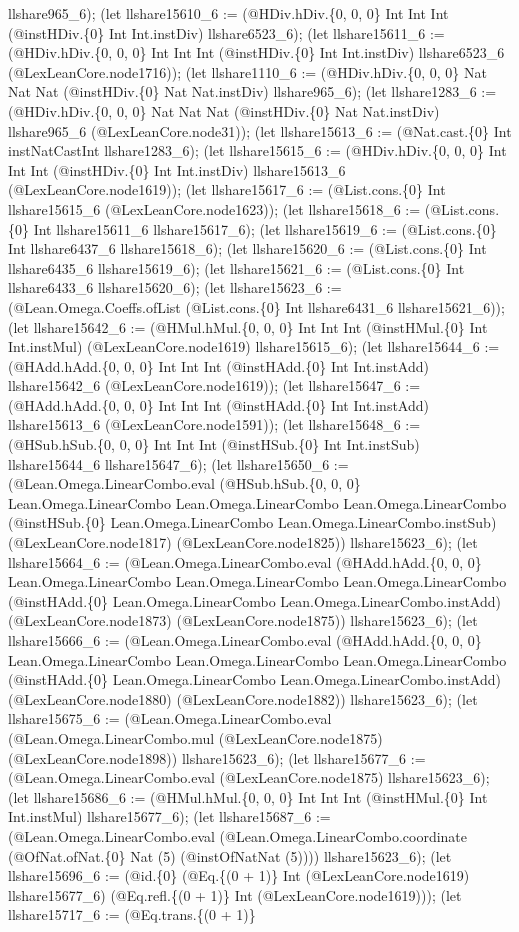 \documentclass[11pt]{article}
\begin{document}
llshare965\_6); (let llshare15610\_6 := (@HDiv.hDiv.\{0, 0, 0\} Int Int Int (@instHDiv.\{0\} Int Int.instDiv) llshare6523\_6); (let llshare15611\_6 := (@HDiv.hDiv.\{0, 0, 0\} Int Int Int (@instHDiv.\{0\} Int Int.instDiv) llshare6523\_6 (@LexLeanCore.node1716)); (let llshare1110\_6 := (@HDiv.hDiv.\{0, 0, 0\} Nat Nat Nat (@instHDiv.\{0\} Nat Nat.instDiv) llshare965\_6); (let llshare1283\_6 := (@HDiv.hDiv.\{0, 0, 0\} Nat Nat Nat (@instHDiv.\{0\} Nat Nat.instDiv) llshare965\_6 (@LexLeanCore.node31)); (let llshare15613\_6 := (@Nat.cast.\{0\} Int instNatCastInt llshare1283\_6); (let llshare15615\_6 := (@HDiv.hDiv.\{0, 0, 0\} Int Int Int (@instHDiv.\{0\} Int Int.instDiv) llshare15613\_6 (@LexLeanCore.node1619)); (let llshare15617\_6 := (@List.cons.\{0\} Int llshare15615\_6 (@LexLeanCore.node1623)); (let llshare15618\_6 := (@List.cons.\{0\} Int llshare15611\_6 llshare15617\_6); (let llshare15619\_6 := (@List.cons.\{0\} Int llshare6437\_6 llshare15618\_6); (let llshare15620\_6 := (@List.cons.\{0\} Int llshare6435\_6 llshare15619\_6); (let llshare15621\_6 := (@List.cons.\{0\} Int llshare6433\_6 llshare15620\_6); (let llshare15623\_6 := (@Lean.Omega.Coeffs.ofList (@List.cons.\{0\} Int llshare6431\_6 llshare15621\_6)); (let llshare15642\_6 := (@HMul.hMul.\{0, 0, 0\} Int Int Int (@instHMul.\{0\} Int Int.instMul) (@LexLeanCore.node1619) llshare15615\_6); (let llshare15644\_6 := (@HAdd.hAdd.\{0, 0, 0\} Int Int Int (@instHAdd.\{0\} Int Int.instAdd) llshare15642\_6 (@LexLeanCore.node1619)); (let llshare15647\_6 := (@HAdd.hAdd.\{0, 0, 0\} Int Int Int (@instHAdd.\{0\} Int Int.instAdd) llshare15613\_6 (@LexLeanCore.node1591)); (let llshare15648\_6 := (@HSub.hSub.\{0, 0, 0\} Int Int Int (@instHSub.\{0\} Int Int.instSub) llshare15644\_6 llshare15647\_6); (let llshare15650\_6 := (@Lean.Omega.LinearCombo.eval (@HSub.hSub.\{0, 0, 0\} Lean.Omega.LinearCombo Lean.Omega.LinearCombo Lean.Omega.LinearCombo (@instHSub.\{0\} Lean.Omega.LinearCombo Lean.Omega.LinearCombo.instSub) (@LexLeanCore.node1817) (@LexLeanCore.node1825)) llshare15623\_6); (let llshare15664\_6 := (@Lean.Omega.LinearCombo.eval (@HAdd.hAdd.\{0, 0, 0\} Lean.Omega.LinearCombo Lean.Omega.LinearCombo Lean.Omega.LinearCombo (@instHAdd.\{0\} Lean.Omega.LinearCombo Lean.Omega.LinearCombo.instAdd) (@LexLeanCore.node1873) (@LexLeanCore.node1875)) llshare15623\_6); (let llshare15666\_6 := (@Lean.Omega.LinearCombo.eval (@HAdd.hAdd.\{0, 0, 0\} Lean.Omega.LinearCombo Lean.Omega.LinearCombo Lean.Omega.LinearCombo (@instHAdd.\{0\} Lean.Omega.LinearCombo Lean.Omega.LinearCombo.instAdd) (@LexLeanCore.node1880) (@LexLeanCore.node1882)) llshare15623\_6); (let llshare15675\_6 := (@Lean.Omega.LinearCombo.eval (@Lean.Omega.LinearCombo.mul (@LexLeanCore.node1875) (@LexLeanCore.node1898)) llshare15623\_6); (let llshare15677\_6 := (@Lean.Omega.LinearCombo.eval (@LexLeanCore.node1875) llshare15623\_6); (let llshare15686\_6 := (@HMul.hMul.\{0, 0, 0\} Int Int Int (@instHMul.\{0\} Int Int.instMul) llshare15677\_6); (let llshare15687\_6 := (@Lean.Omega.LinearCombo.eval (@Lean.Omega.LinearCombo.coordinate (@OfNat.ofNat.\{0\} Nat (5) (@instOfNatNat (5)))) llshare15623\_6); (let llshare15696\_6 := (@id.\{0\} (@Eq.\{(0 + 1)\} Int (@LexLeanCore.node1619) llshare15677\_6) (@Eq.refl.\{(0 + 1)\} Int (@LexLeanCore.node1619))); (let llshare15717\_6 := (@Eq.trans.\{(0 + 1)\} 
\end{document}
